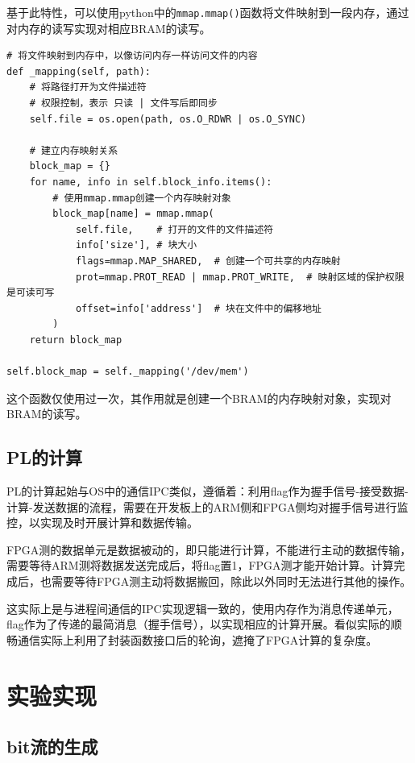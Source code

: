 \documentclass[12pt,a4paper]{article}
\begin{document}
基于此特性，可以使用python中的\texttt{mmap.mmap()}函数将文件映射到一段内存，通过对内存的读写实现对相应BRAM的读写。

\begin{lstlisting}
# 将文件映射到内存中，以像访问内存一样访问文件的内容
def _mapping(self, path):
    # 将路径打开为文件描述符
    # 权限控制，表示 只读 | 文件写后即同步
    self.file = os.open(path, os.O_RDWR | os.O_SYNC)

    # 建立内存映射关系
    block_map = {}
    for name, info in self.block_info.items():
        # 使用mmap.mmap创建一个内存映射对象
        block_map[name] = mmap.mmap(
            self.file,    # 打开的文件的文件描述符
            info['size'], # 块大小
            flags=mmap.MAP_SHARED,  # 创建一个可共享的内存映射
            prot=mmap.PROT_READ | mmap.PROT_WRITE,  # 映射区域的保护权限是可读可写
            offset=info['address']  # 块在文件中的偏移地址
        )
    return block_map

self.block_map = self._mapping('/dev/mem')
\end{lstlisting}

这个函数仅使用过一次，其作用就是创建一个BRAM的内存映射对象，实现对BRAM的读写。

\subsection{PL的计算}

PL的计算起始与OS中的通信IPC类似，遵循着：利用flag作为握手信号-接受数据-计算-发送数据的流程，需要在开发板上的ARM侧和FPGA侧均对握手信号进行监控，以实现及时开展计算和数据传输。

FPGA测的数据单元是数据被动的，即只能进行计算，不能进行主动的数据传输，需要等待ARM测将数据发送完成后，将flag置1，FPGA测才能开始计算。计算完成后，也需要等待FPGA测主动将数据搬回，除此以外同时无法进行其他的操作。

这实际上是与进程间通信的IPC实现逻辑一致的，使用内存作为消息传递单元，flag作为了传递的最简消息（握手信号），以实现相应的计算开展。看似实际的顺畅通信实际上利用了封装函数接口后的轮询，遮掩了FPGA计算的复杂度。

\section{实验实现}

\subsection{bit流的生成}
\end{document}
